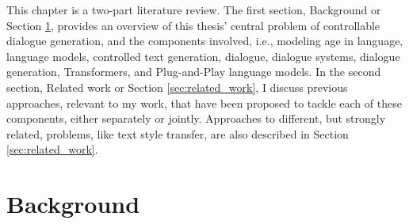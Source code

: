 
This chapter is a two-part literature review. The first section, Background or Section \ref{sec:background}, provides an overview of this thesis' central problem of controllable dialogue generation, and the components involved, i.e., 
modeling age in language, language models, controlled text generation, dialogue, dialogue systems, dialogue generation, Transformers, and Plug-and-Play language models. 
In the second section, Related work or Section \ref{sec:related_work}, I discuss previous approaches, relevant to my work, that have been proposed to tackle each of these components, either separately or jointly. Approaches to different, but strongly related, problems, like text style transfer, are also described in Section \ref{sec:related_work}.

\section{Background}
\label{sec:background}



